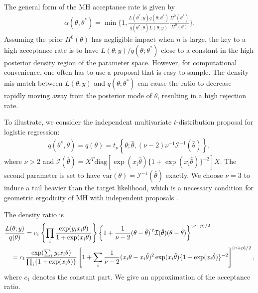 \documentclass[twoside,11pt]{article}
\newcommand{\diag}{\text{diag}}
\newcommand{\1}{\mathbf 1}
\begin{document}
{The general form of the MH acceptance rate is given by
\begin{equation*}
	\begin{aligned}
    \alpha(\theta,\theta^*) = \min\bigg\{ 1, \frac{L(\theta^*;y)q(\theta;\theta^*)}{q(\theta^*;\theta)L(\theta;y)} \frac{\Pi^0(\theta^*)}{\Pi^0(\theta)}\bigg\}.
	\end{aligned}
\end{equation*}
Assuming the prior $\Pi^0(\theta)$  has negligible impact when $n$ is large, the key to a high acceptance rate is to have $L(\theta;y)/q(\theta;\theta^*)$ close to a constant in the high posterior density region of the parameter space. However, for computational convenience, one often has to use a proposal that is easy to sample. The density mis-match between $L(\theta;y)$ and $q(\theta;\theta^*)$  can cause the ratio to decrease rapidly moving away from the posterior mode of $\theta$,  resulting in a high rejection rate.

To illustrate, we consider the independent multivariate $t$-distribution proposal for logistic regression:
\begin{equation*}
	\begin{aligned}
    q(\theta^*,\theta)=q(\theta) = t_{\nu} \left\{ \theta ; \hat\theta, (\nu-2){\nu}^{-1} \mathcal{I}^{-1}(\hat\theta) \right\},
	\end{aligned}
\end{equation*}
where $\nu>2$ and $\mathcal{I}(\hat\theta)= X^{T} \diag[ \exp(x_i\hat\theta) \{ 1+\exp(x_i\hat\theta) \}^{-2} ] X$. The second parameter is set to have $\mbox{var}(\theta)=\mathcal{I}^{-1}(\hat\theta)$ exactly. We choose $\nu=3$ to induce a tail heavier than the target likelihood, which is a necessary condition for geometric ergodicity of MH with independent proposals \citep{mengersen1996rates}.

The density ratio is
\begin{equation}
\label{eq:density_ratio_indep_proposal}
	\begin{aligned}
&    \frac{L(\theta;y)}{q(\theta)} =  c_1\left \{ \prod_i \frac{ \exp(y_i x_i\theta )}{1+\exp( x_i\theta)} \right \}\left \{ 1+\frac{1}{\nu-2} (\theta-\hat\theta )^{\rm T}{\mathcal{I}(\hat\theta)} (\theta-\hat\theta ) \right\}^{(\nu+p)/2} \\
   &  \quad =  c_1  \frac{  \exp(\sum_i y_i x_i\theta )}{  \prod_i \{ 1+\exp( x_i\theta)\}}   \left [ 1+ \sum_i \frac{1}{\nu-2} (x_i \theta-x_i \hat\theta  )^2  \exp(x_i\hat\theta) \{ 1+\exp(x_i\hat\theta) \}^{-2} \right ]^{(\nu+p)/2},
	\end{aligned}
\end{equation}
where  $c_1$ denotes the constant part. We give an approximation of the acceptance ratio.

}
\end{document}
